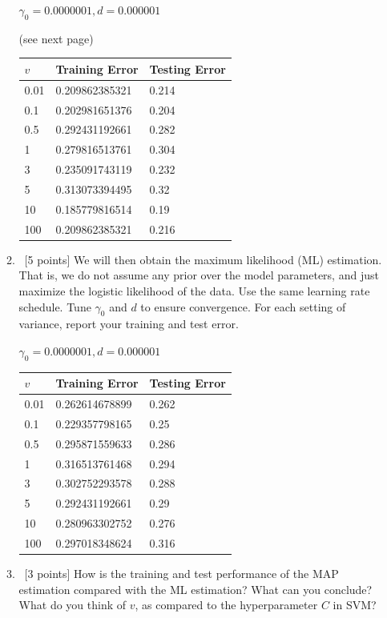 \documentclass[12pt, fullpage,letterpaper]{article}
\begin{document}
\begin{enumerate}
\begin{enumerate}
		$\gamma_0 = 0.0000001, d = 0.000001$
		
		(see next page)
		
		\begin{table}[h]
			\begin{tabular}{l||ll}
				$v$ & Training Error & Testing Error \\
				\hline\hline
				0.01 & 0.209862385321 & 0.214 \\
				0.1 & 0.202981651376 & 0.204 \\
				0.5 & 0.292431192661 & 0.282 \\
				1 & 0.279816513761 & 0.304 \\
				3 & 0.235091743119 & 0.232 \\
				5 & 0.313073394495 & 0.32 \\
				10 & 0.185779816514 & 0.19 \\
				100 & 0.209862385321 & 0.216 \\
			\end{tabular}
		\end{table}
		 
		\item~[5 points] We will then obtain the maximum likelihood (ML) estimation. That is, we do not assume any prior over the model parameters, and just maximize the logistic likelihood of the data. Use the same learning rate schedule. Tune $\gamma_0$ and $d$ to ensure convergence. For each setting of variance, report your training and test error. 
		
		$\gamma_0 = 0.0000001, d = 0.000001$
		\begin{table}[h]
			\begin{tabular}{l||ll}
				$v$ & Training Error & Testing Error \\
				\hline\hline
				0.01 & 0.262614678899 & 0.262 \\
				0.1 & 0.229357798165 & 0.25 \\
				0.5 & 0.295871559633 & 0.286 \\
				1 & 0.316513761468 & 0.294 \\
				3 & 0.302752293578 & 0.288 \\
				5 & 0.292431192661 & 0.29 \\
				10 & 0.280963302752 & 0.276 \\
				100 & 0.297018348624 & 0.316 \\
			\end{tabular}
		\end{table}
		
		\item~[3 points] How is the training and test performance of the MAP estimation compared with the ML estimation? What can you conclude? What do you think of $v$, as compared to  the hyperparameter $C$ in SVM?
		

\end{enumerate}
\end{enumerate}
\end{document}
